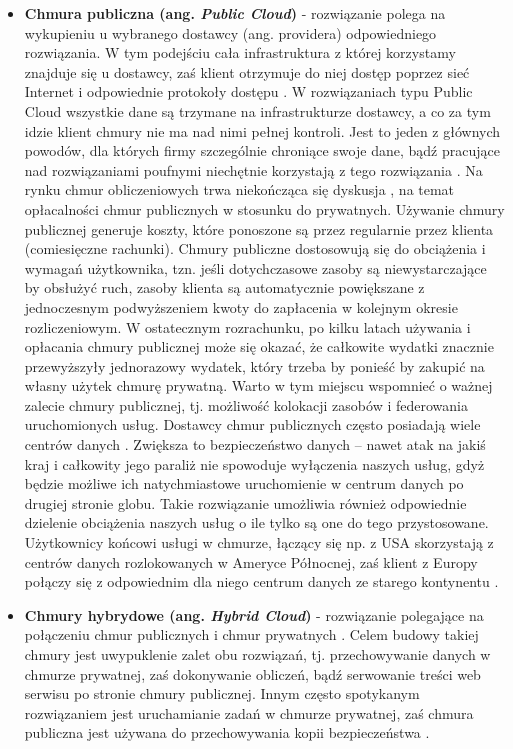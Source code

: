 \documentclass[10pt,a4paper,titlepage,twoside]{report}
\begin{document}
\begin{itemize}
	\item \textbf{Chmura publiczna (ang. \textit{Public Cloud})} - rozwiązanie polega na wykupieniu u wybranego dostawcy (ang. providera) odpowiedniego rozwiązania. W tym podejściu cała infrastruktura z której korzystamy znajduje się u dostawcy, zaś klient otrzymuje do niej dostęp poprzez sieć Internet i odpowiednie protokoły dostępu \cite{ad12}. W rozwiązaniach typu Public Cloud wszystkie dane są trzymane na infrastrukturze dostawcy, a co za tym idzie klient chmury nie ma nad nimi pełnej kontroli. Jest to jeden z głównych powodów, dla których firmy szczególnie chroniące swoje dane, bądź pracujące nad rozwiązaniami poufnymi niechętnie korzystają z tego rozwiązania \cite{ad11}. Na rynku chmur obliczeniowych trwa niekończąca się dyskusja \cite{ad13}, na temat opłacalności chmur publicznych w stosunku do prywatnych. Używanie chmury publicznej generuje koszty, które ponoszone są przez regularnie przez klienta (comiesięczne rachunki). Chmury publiczne dostosowują się do obciążenia i wymagań użytkownika, tzn. jeśli dotychczasowe zasoby są niewystarczające by obsłużyć ruch, zasoby klienta są automatycznie powiększane z jednoczesnym podwyższeniem kwoty do zapłacenia w kolejnym okresie rozliczeniowym. W ostatecznym rozrachunku, po kilku latach używania i opłacania chmury publicznej może się okazać, że całkowite wydatki znacznie przewyższyły jednorazowy wydatek, który trzeba by ponieść by zakupić na własny użytek chmurę prywatną. Warto w tym miejscu wspomnieć o ważnej zalecie chmury publicznej, tj. możliwość kolokacji zasobów i federowania uruchomionych usług. Dostawcy chmur publicznych często posiadają wiele centrów danych \cite{ad11}. Zwiększa to bezpieczeństwo danych – nawet atak na jakiś kraj i całkowity jego paraliż nie spowoduje wyłączenia naszych usług, gdyż będzie możliwe ich natychmiastowe uruchomienie w centrum danych po drugiej stronie globu. Takie rozwiązanie umożliwia również odpowiednie dzielenie obciążenia naszych usług o ile tylko są one do tego przystosowane. Użytkownicy końcowi usługi w chmurze, łączący się np. z USA skorzystają z centrów danych rozlokowanych w Ameryce Północnej, zaś klient z Europy połączy się z odpowiednim dla niego centrum danych ze starego kontynentu \cite{ad11}.
	\item \textbf{Chmury hybrydowe (ang. \textit{Hybrid Cloud})} - rozwiązanie polegające na połączeniu chmur publicznych i chmur prywatnych \cite{ad13}. Celem budowy takiej chmury jest uwypuklenie zalet obu rozwiązań, tj. przechowywanie danych w chmurze prywatnej, zaś dokonywanie obliczeń, bądź serwowanie treści web serwisu po stronie chmury publicznej. Innym często spotykanym rozwiązaniem jest uruchamianie zadań w chmurze prywatnej, zaś chmura publiczna jest używana do przechowywania kopii bezpieczeństwa \cite{ad13}.
\end{itemize}
\end{document}

